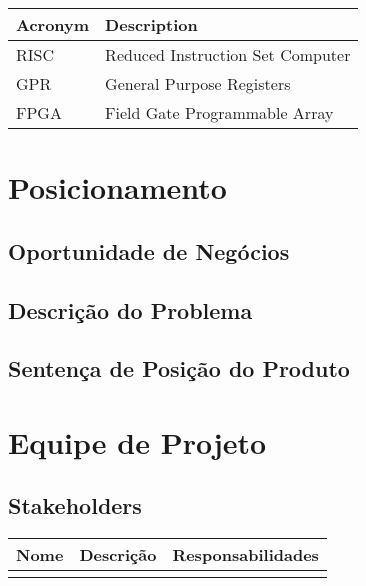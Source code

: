 \documentclass{article}
\begin{document}
  \FloatBarrier
  \begin{table}[H]
    \begin{center}
      \begin{tabular}[pos]{|m{2cm} | m{9cm}|} 
        \hline
        \cellcolor[gray]{0.9}\textbf{Acronym} & \cellcolor[gray]{0.9}\textbf{Description} \\ \hline
        RISC & Reduced Instruction Set Computer \\ \hline
        GPR & General Purpose Registers \\ \hline
        FPGA & Field Gate Programmable Array \\ \hline
      \end{tabular}
    \end{center}
  \end{table}
  

\section{Posicionamento}
\subsection{Oportunidade de Negócios}

\subsection{Descrição do Problema}

\subsection{Sentença de Posição do Produto}

\section{Equipe de Projeto}

\subsection{Stakeholders}

  \FloatBarrier
  \begin{table}[H]
    \begin{center}
      \begin{tabular}[pos]{|m{4cm} | m{5cm}| m{6cm} |} 
        \hline
        \cellcolor[gray]{0.9}\textbf{Nome} & \cellcolor[gray]{0.9}\textbf{Descrição} & \cellcolor[gray]{0.9}\textbf{Responsabilidades}\\ \hline
         & & \\ \hline
       
      \end{tabular}
    \end{center}
  \end{table}
\end{document}
